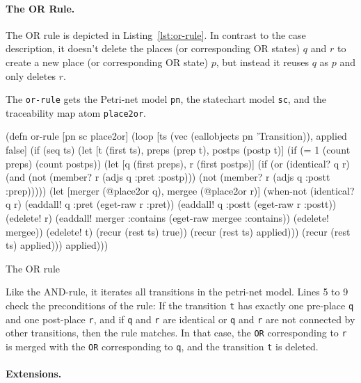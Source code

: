 \documentclass[submission]{eptcs}
\begin{document}
\paragraph{The OR Rule.}
\label{sec:or-rule}

The OR rule is depicted in Listing~\ref{lst:or-rule}.  In contrast to the case
description, it doesn't delete the places (or corresponding OR states) $q$ and
$r$ to create a new place (or corresponding OR state) $p$, but instead it
reuses $q$ as $p$ and only deletes $r$.

The \verb|or-rule| gets the Petri-net model \verb|pn|, the statechart model
\verb|sc|, and the traceability map atom \verb|place2or|.

\begin{listing}[h!]
  \begin{clojurecode}
(defn or-rule [pn sc place2or]
  (loop [ts (vec (eallobjects pn 'Transition)), applied false]
    (if (seq ts)
      (let [t (first ts), preps (prep t), postps (postp t)]
        (if (= 1 (count preps) (count postps))
          (let [q (first preps), r (first postps)]
            (if (or (identical? q r)
                    (and (not (member? r (adjs q :pret :postp)))
                         (not (member? r (adjs q :postt :prep)))))
              (let [merger (@place2or q), mergee (@place2or r)]
                (when-not (identical? q r)
                  (eaddall! q :pret  (eget-raw r :pret))
                  (eaddall! q :postt (eget-raw r :postt))
                  (edelete! r)
                  (eaddall! merger :contains (eget-raw mergee :contains))
                  (edelete! mergee))
                (edelete! t)
                (recur (rest ts) true))
              (recur (rest ts) applied)))
          (recur (rest ts) applied)))
      applied)))
  \end{clojurecode}
  \label{lst:or-rule}
  \caption{The OR rule}
\end{listing}

Like the AND-rule, it iterates all transitions in the petri-net model.  Lines 5
to 9 check the preconditions of the rule: If the transition \verb|t| has
exactly one pre-place \verb|q| and one post-place \verb|r|, and if \verb|q| and
\verb|r| are identical or \verb|q| and \verb|r| are not connected by other
transitions, then the rule matches.  In that case, the \verb|OR| corresponding
to \verb|r| is merged with the \verb|OR| corresponding to \verb|q|, and the
transition \verb|t| is deleted.


\paragraph{Extensions.}
\label{sec:extensions}
\end{document}
